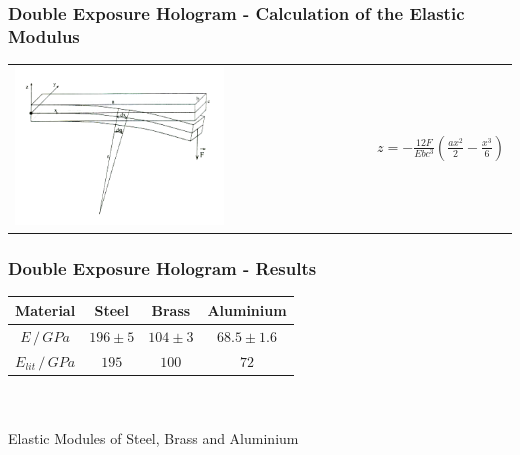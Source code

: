\documentclass[10pt]{beamer}
\newcommand{\graTwoOneB}[4][]{
	\begin{table}
		\centering
		\begin{tabular}[width=\textwidth]{c}
			\texttt{[image: ../figures/\#2.png]}\\
			\texttt{[image: ../figures/\#3.png]}\\
			#4
		\end{tabular}
	\end{table}
}
\begin{document}
\begin{frame}
	\frametitle{Double Exposure Hologram - Calculation of the Elastic Modulus}
	\begin{table}
		\centering
		\begin{tabular}[width=\textwidth]{m{6cm}m{4cm}}
			\includegraphics[width=0.6\textwidth]{../figures/balken_biegen.png}&
			$z=-\frac{12F}{Ebc^3}\left(\frac{ax^2}{2}-\frac{x^3}{6} \right)$
		\end{tabular}
	\end{table}
\end{frame}

\begin{frame}
	\frametitle{Double Exposure Hologram - Results}
	\begin{table}
		\begin{tabular}{c|ccc}
			Material&Steel&Brass&Aluminium\\\hline
			$E\,/\,\si{GPa}$&$196\pm5$&$104\pm3$&$68.5\pm1.6$\\
			$E_{lit}\,/\,\si{GPa}$\footfullcite{staats}&$195$&$100$&$72$
		\end{tabular}\\\scriptsize\ \\
		{\small Elastic Modules of Steel, Brass and Aluminium}
	\end{table}
\end{frame}
\end{document}
